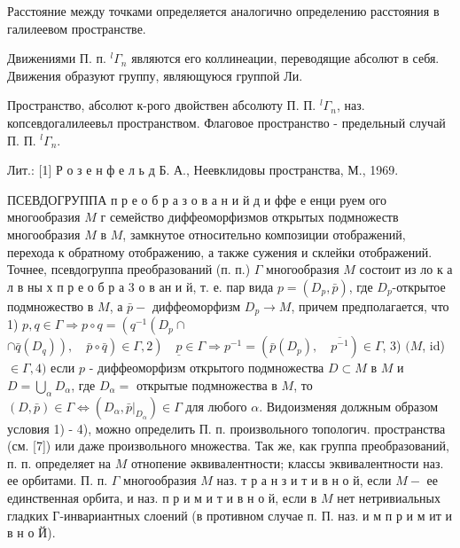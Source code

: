 \documentclass[10pt]{article}
\begin{document}
Расстояние между точками определяется аналогично определению расстояния в галилеевом пространстве.



Движениями П. п. ${ }^{l} \Gamma_{n}$ являются его коллинеации, переводящие абсолют в себя. Движения образуют группу, являющуюся группой Ли.



Пространство, абсолют к-рого двойствен абсолюту П. П. ${ }^{l} \Gamma_{n}$, наз. копсевдогалилеевьл пространством. Флаговое пространство - предельный случай П. П. ${ }^{l} \Gamma_{n}$.



Лит.: [1] Р о з е н ф е л ь д Б. А., Неевклидовы пространства, М., 1969.



ПСЕВДОГРУППА п р е о б р а з о в а н и й д и ффе е енци руем ого многообразия $M$ г семейство диффеоморфизмов открытых подмножеств многообразия $M$ в $M$, замкнутое относительно композиции отображений, перехода к обратному отображению, а также сужения и склейки отображений. Точнее, псевдогруппа преобразований (п. п.) $\Gamma$ многообразия $M$ состоит из ло к а л в ны х п р е о б р а 3 о в ан и й, т. е. пар вида $p=\left(D_{p}, \bar{p}\right)$, где $D_{p}$-открытое подмножество в $M$, а $\bar{p}-$ диффеоморфизм $D_{p} \rightarrow M$, причем предполагается, что 1) $p, q \in \Gamma \Rightarrow p \circ q=\left(q^{-1}\left(D_{p} \cap\right.\right.$ $\left.\left.\left.\cap \bar{q}\left(D_{q}\right)\right), \quad \bar{p} \circ \bar{q}\right) \in \Gamma, 2\right) \quad \underline{p} \in \Gamma \Rightarrow p^{-1}=\left(\bar{p}\left(D_{p}\right), \quad \overline{p^{-1}}\right) \in \Gamma$, 3) $(M$, id) $\in \Gamma, 4)$ если $p$ - диффеоморфизм открытого подмножества $D \subset M$ в $M$ и $D=\bigcup_{\alpha} D_{\alpha}$, где $D_{\alpha}=$ открытые подмножества в $M$, то $(D, \bar{p}) \in \Gamma \Leftrightarrow\left(D_{\alpha},\left.\bar{p}\right|_{D_{\alpha}}\right) \in \Gamma$ для любого $\alpha$. Видоизменяя должным образом условия 1) - 4), можно определить П. п. произвольного топологич. пространства (см. [7]) или даже произвольного множества. Так же, как группа преобразований, п. п. определяет на $M$ отнопение әквивалентности; классы эквивалентности наз. ее орбитами. П. п. $\Gamma$ многообразия $M$ наз. т р а н з и т и в н о й, если $M-$ ее единственная орбита, и наз. п р и м и т и в н о й, если в $M$ нет нетривиальных гладких Г-инвариантных слоений (в противном случае п. П. наз. и м п р и м ит и в н о Й).
\end{document}
